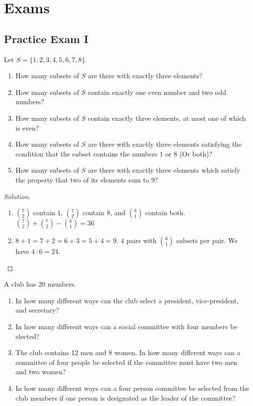     \section{Exams}
    \subsection{Practice Exam I}
    \begin{problem}
    Let $S = \{1,2,3,4,5,6,7,8\}$.
    \begin{enumerate}
        \item How many subsets of $S$ are there with exactly three elements?
        \item How many subsets of $S$ contain exactly one even number and two odd numbers?
        \item How many subsets of $S$ contain exactly three elements, at most one of which is even?
        \item How many subsets of $S$ are there with exactly three elements satisfying the condition that the subset contains the numbers $1$ or $8$ (Or both)?
        \item How many subsets of $S$ are there with exactly three elements which satisfy the property that two of its elements sum to $9$?
    \end{enumerate}
    \end{problem}
    \begin{proof}[Solution]
    \
    \begin{enumerate}
    \begin{multicols}{3}
        \item $\binom{8}{3} = \frac{8!}{3!(8-3)!} = 56$
        \item $\binom{4}{1}\binom{4}{2} = 24$
        \item $\binom{4}{1} \binom{4}{2} + \binom{4}{0} \binom{4}{3} = 28$.
    \end{multicols}
        \item $\binom{7}{2}$ contain $1$, $\binom{7}{2}$ contain $8$, and $\binom{6}{1}$ contain both. $\binom{7}{2}+\binom{7}{2}-\binom{6}{1}=36$
        \item $8+1=7+2=6+3=5+4=9$. $4$ pairs with $\binom{6}{1}$ subsets per pair. We have $4\cdot 6 = 24$.
    \end{enumerate}
    \end{proof}
    \begin{problem}
    A club has $20$ members.
    \begin{enumerate}
        \item In how many different ways can the club select a president, vice-president, and secretary?
        \item In how many different ways can a social committee with four members be elected?
        \item The club contains 12 men and 8 women. In how many different ways can a committee of four people be selected if the committee must have two men and two women?
        \item In how many different ways can a four person committee be selected from the club members if one person is designated as the leader of the committee?
    \end{enumerate}
    \end{problem}
